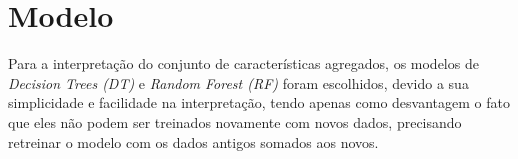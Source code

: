 \section{Modelo}

Para a interpretação do conjunto de características 
agregados, os modelos de \emph{Decision Trees (DT)} e 
\emph{Random Forest (RF)} foram escolhidos, devido a 
sua simplicidade e facilidade na interpretação, tendo apenas 
como desvantagem o fato que eles não podem ser treinados 
novamente com novos dados, precisando retreinar o modelo 
com os dados antigos somados aos novos.